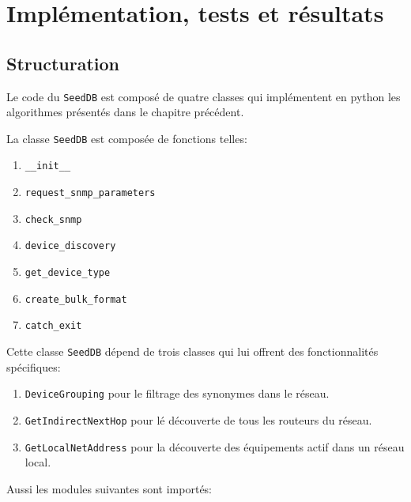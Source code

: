 \section{Implémentation, tests et résultats}
\subsection{Structuration}
Le code du \texttt{SeedDB} est composé de quatre classes qui implémentent en python les algorithmes présentés dans le chapitre précédent.

La classe \texttt{SeedDB} est composée de fonctions telles:
\begin{enumerate}
\item \texttt{\_\_init\_\_}
\item \texttt{request\_snmp\_parameters}
\item \texttt{check\_snmp}
\item \texttt{device\_discovery}
\item \texttt{get\_device\_type}
\item \texttt{create\_bulk\_format}
\item \texttt{catch\_exit}
\end{enumerate}
Cette classe \texttt{SeedDB} dépend de trois classes qui lui offrent des fonctionnalités spécifiques:
\begin{enumerate}
\item \texttt{DeviceGrouping} pour le filtrage des synonymes dans le réseau.
\item \texttt{GetIndirectNextHop} pour lé découverte de tous les routeurs du réseau.
\item \texttt{GetLocalNetAddress} pour la découverte des équipements actif dans un réseau local.
\end{enumerate}
Aussi les modules suivantes sont importés:
